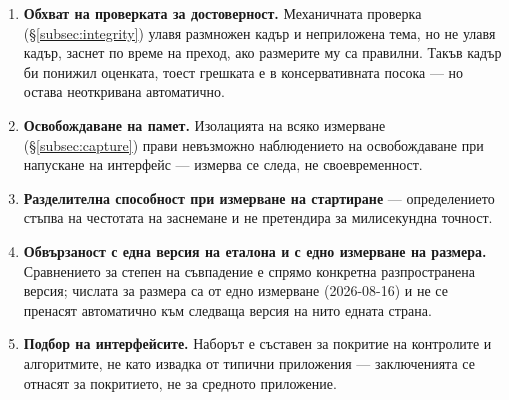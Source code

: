 \begin{enumerate}[topsep=2pt,itemsep=1pt,leftmargin=*]
\item \textbf{Обхват на проверката за достоверност.} Механичната проверка (§\ref{subsec:integrity})
      улавя размножен кадър и неприложена тема, но не улавя кадър, заснет по време на преход, ако
      размерите му са правилни. Такъв кадър би понижил оценката, тоест грешката е в консервативната
      посока --- но остава неоткривана автоматично.
\item \textbf{Освобождаване на памет.} Изолацията на всяко измерване (§\ref{subsec:capture}) прави
      невъзможно наблюдението на освобождаване при напускане на интерфейс --- измерва се следа, не
      своевременност.
\item \textbf{Разделителна способност при измерване на стартиране} --- определението стъпва на
      честотата на заснемане и не претендира за милисекундна точност.
\item \textbf{Обвързаност с една версия на еталона и с едно измерване на размера.} Сравнението за
      степен на съвпадение е спрямо конкретна разпространена версия; числата за размера са от едно
      измерване (2026-08-16) и не се пренасят автоматично към следваща версия на нито едната страна.
\item \textbf{Подбор на интерфейсите.} Наборът е съставен за покритие на контролите и алгоритмите,
      не като извадка от типични приложения --- заключенията се отнасят за покритието, не за
      средното приложение.
\end{enumerate}
